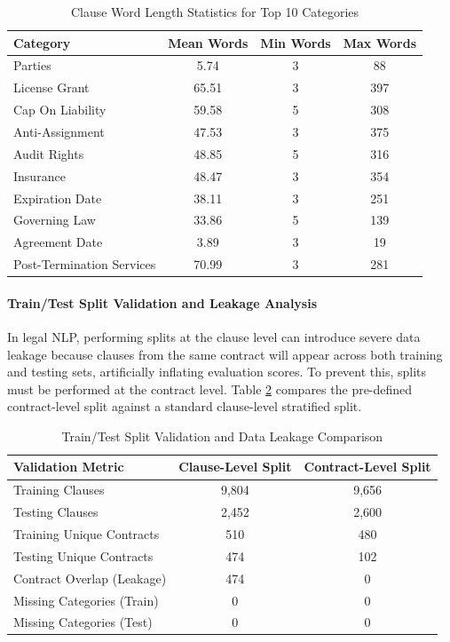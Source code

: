 \documentclass[12pt, a4paper]{report}
\begin{document}
\begin{table}[h]
\centering
\small
\begin{tabular}{lccc}
\toprule
Category & Mean Words & Min Words & Max Words \\
\hline
Parties & 5.74 & 3 & 88 \\
License Grant & 65.51 & 3 & 397 \\
Cap On Liability & 59.58 & 5 & 308 \\
Anti-Assignment & 47.53 & 3 & 375 \\
Audit Rights & 48.85 & 5 & 316 \\
Insurance & 48.47 & 3 & 354 \\
Expiration Date & 38.11 & 3 & 251 \\
Governing Law & 33.86 & 5 & 139 \\
Agreement Date & 3.89 & 3 & 19 \\
Post-Termination Services & 70.99 & 3 & 281 \\
\bottomrule
\end{tabular}
\caption{Clause Word Length Statistics for Top 10 Categories}
\label{tab:length_by_category}
\end{table}

\paragraph{Train/Test Split Validation and Leakage Analysis}
In legal NLP, performing splits at the clause level can introduce severe data leakage because clauses from the same contract will appear across both training and testing sets, artificially inflating evaluation scores. To prevent this, splits must be performed at the contract level. Table \ref{tab:split_validation} compares the pre-defined contract-level split against a standard clause-level stratified split.

\begin{table}[h]
\centering
\small
\begin{tabular}{lcc}
\toprule
Validation Metric & Clause-Level Split & Contract-Level Split \\
\hline
Training Clauses & 9,804 & 9,656 \\
Testing Clauses & 2,452 & 2,600 \\
Training Unique Contracts & 510 & 480 \\
Testing Unique Contracts & 474 & 102 \\
Contract Overlap (Leakage) & 474 & 0 \\
Missing Categories (Train) & 0 & 0 \\
Missing Categories (Test) & 0 & 0 \\
\bottomrule
\end{tabular}
\caption{Train/Test Split Validation and Data Leakage Comparison}
\label{tab:split_validation}
\end{table}
\end{document}
